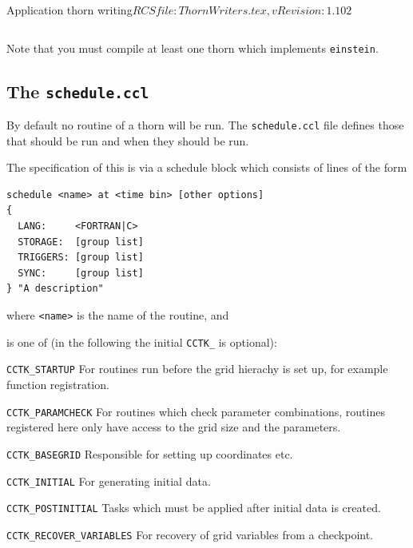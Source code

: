 \begin{cactuspart}{2}{Application thorn writing}{$RCSfile: ThornWriters.tex,v $}{$Revision: 1.102 $}
\begin{verbatim}
\end{verbatim}

Note that you must compile at least one thorn which implements {\tt einstein}.



\subsection{The {\tt schedule.ccl}}
\label{subsec:schedule_ccl}
By default no routine of a thorn will be run.  The {\tt schedule.ccl} file
defines those that should be run and when they should be run.

The specification of this is via a schedule block which consists of
 lines of the form

\begin{verbatim}
schedule <name> at <time bin> [other options]
{
  LANG:     <FORTRAN|C>
  STORAGE:  [group list]
  TRIGGERS: [group list]
  SYNC:     [group list]
} "A description"
\end{verbatim}
where {\tt <name>} is the name of the routine, and

\begin{Lentry}

\item[{\tt <time bin>}] is one of
(in the following the initial {\tt CCTK\_} is optional):

\begin{Lentry}

\item [{\tt CCTK\_STARTUP}]
For routines run before the grid hierachy is set up, for example function
registration.

\item [{\tt CCTK\_PARAMCHECK}]
For routines which check parameter combinations, routines registered here
only have access to the grid size and the parameters.

\item [{\tt CCTK\_BASEGRID}]
Responsible for setting up coordinates etc.

\item [{\tt CCTK\_INITIAL}]
For generating initial data.

\item [{\tt CCTK\_POSTINITIAL}]
Tasks which must be applied after initial data is created.

\item [{\tt CCTK\_RECOVER\_VARIABLES}]
For recovery of grid variables from a checkpoint.


\end{Lentry}
\end{Lentry}
\end{cactuspart}
